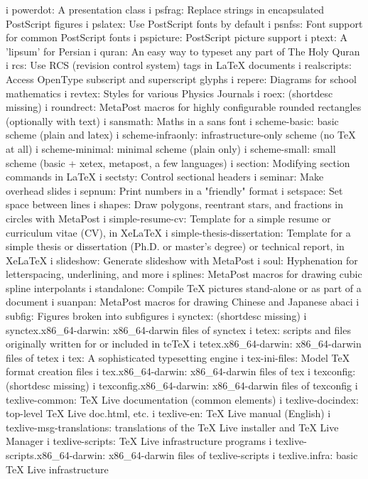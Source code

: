 i powerdot: A presentation class
i psfrag: Replace strings in encapsulated PostScript figures
i pslatex: Use PostScript fonts by default
i psnfss: Font support for common PostScript fonts
i pspicture: PostScript picture support
i ptext: A 'lipsum' for Persian
i quran: An easy way to typeset any part of The Holy Quran
i rcs: Use RCS (revision control system) tags in LaTeX documents
i realscripts: Access OpenType subscript and superscript glyphs
i repere: Diagrams for school mathematics
i revtex: Styles for various Physics Journals
i roex: (shortdesc missing)
i roundrect: MetaPost macros for highly configurable rounded rectangles (optionally with text)
i sansmath: Maths in a sans font
i scheme-basic: basic scheme (plain and latex)
i scheme-infraonly: infrastructure-only scheme (no TeX at all)
i scheme-minimal: minimal scheme (plain only)
i scheme-small: small scheme (basic + xetex, metapost, a few languages)
i section: Modifying section commands in LaTeX
i sectsty: Control sectional headers
i seminar: Make overhead slides
i sepnum: Print numbers in a "friendly" format
i setspace: Set space between lines
i shapes: Draw polygons, reentrant stars, and fractions in circles with MetaPost
i simple-resume-cv: Template for a simple resume or curriculum vitae (CV), in XeLaTeX
i simple-thesis-dissertation: Template for a simple thesis or dissertation (Ph.D. or master's degree) or technical report, in XeLaTeX
i slideshow: Generate slideshow with MetaPost
i soul: Hyphenation for letterspacing, underlining, and more
i splines: MetaPost macros for drawing cubic spline interpolants
i standalone: Compile TeX pictures stand-alone or as part of a document
i suanpan: MetaPost macros for drawing Chinese and Japanese abaci
i subfig: Figures broken into subfigures
i synctex: (shortdesc missing)
i synctex.x86_64-darwin: x86_64-darwin files of synctex
i tetex: scripts and files originally written for or included in teTeX
i tetex.x86_64-darwin: x86_64-darwin files of tetex
i tex: A sophisticated typesetting engine
i tex-ini-files: Model TeX format creation files
i tex.x86_64-darwin: x86_64-darwin files of tex
i texconfig: (shortdesc missing)
i texconfig.x86_64-darwin: x86_64-darwin files of texconfig
i texlive-common: TeX Live documentation (common elements)
i texlive-docindex: top-level TeX Live doc.html, etc.
i texlive-en: TeX Live manual (English)
i texlive-msg-translations: translations of the TeX Live installer and TeX Live Manager
i texlive-scripts: TeX Live infrastructure programs
i texlive-scripts.x86_64-darwin: x86_64-darwin files of texlive-scripts
i texlive.infra: basic TeX Live infrastructure
